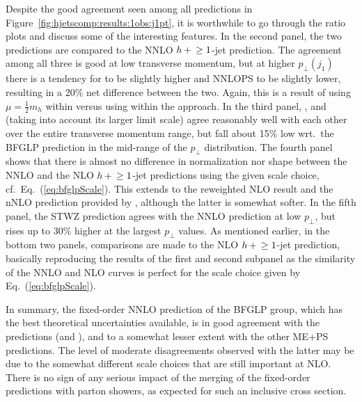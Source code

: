 Despite the good agreement seen among all predictions in
Figure~\ref{fig:hjetscomp:results:1obs:j1pt}, it is worthwhile to go
through the ratio plots and discuss some of the interesting features.
In the second panel, the two \NNLOPS predictions are compared to the
NNLO $h\!\text{~+~}\!\ge1$-jet prediction. The agreement among all three is
good at low transverse momentum, but at higher $p_\perp(j_1)$ there is
a tendency for \Sherpa \NNLOPS to be slightly higher and \Powheg
NNLOPS to be slightly lower, resulting in a 20\% net difference
between the two. Again, this is a result of using
$\mu=\tfrac{1}{2}m_h$ within \Sherpa versus using \Minlo within the
\Powheg approach. In the third panel, \Herwig, \Sherpa and \MGaMC
(taking into account its larger limit scale) agree reasonably well
with each other over the entire transverse momentum range, but fall
about 15\% low wrt.~the BFGLP prediction in the mid-range of the
$p_\perp$ distribution. The fourth panel shows that there is almost no
difference in normalization nor shape between the NNLO and the NLO
$h\!\text{~+~}\!\ge1$-jet predictions using the given scale choice,
cf.~Eq.~(\ref{eq:bfglpScale}). This extends to the \Minlo reweighted
NLO result and the nNLO prediction provided by \Loopsim, although the
latter is somewhat softer. In the fifth panel, the STWZ prediction
agrees with the NNLO prediction at low $p_\perp$, but rises up to 30\%
higher at the largest $p_\perp$ values. As mentioned earlier, in the
bottom two panels, comparisons are made to the NLO $h\!\text{~+~}\!\ge1$-jet
prediction, basically reproducing the results of the first and second
subpanel as the similarity of the NNLO and NLO curves is perfect for
the scale choice given by Eq.~(\ref{eq:bfglpScale}).

In summary, the fixed-order NNLO prediction of the BFGLP group, which
has the best theoretical uncertainties available, is in good agreement
with the \Sherpa predictions (\NNLOPS and \MEPSatNLO), and to a
somewhat lesser extent with the other ME+PS predictions. The level of
moderate disagreements observed with the latter may be due to the
somewhat different scale choices that are still important at
NLO. There is no sign of any serious impact of the merging of the
fixed-order predictions with parton showers, as expected for such an
inclusive cross section.

